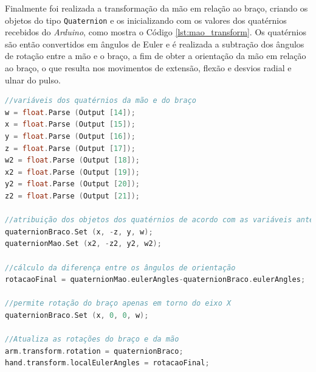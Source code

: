 Finalmente foi realizada a transformação da mão em relação ao braço, criando os objetos do tipo \lstinline!Quaternion! e os inicializando com os valores dos quatérnios recebidos do \textit{Arduino}, como mostra o Código \ref{lst:mao_transform}. Os quatérnios são então convertidos em ângulos de Euler e é realizada a subtração dos ângulos de rotação entre a mão e o braço, a fim de obter a orientação da mão em relação ao braço, o que resulta nos movimentos de extensão, flexão e desvios radial e ulnar do pulso.

\begin{lstlisting}[language=C++,label=lst:mao_transform,caption={Transformações da mão},morekeywords={SerialPort,IsOpen,Close,Open,Quaternion,GameObject,Vector3,Split,transform,localEulerAngles,Parse,Set,eulerAngles}]
//variáveis dos quatérnios da mão e do braço
w = float.Parse (Output [14]);
x = float.Parse (Output [15]);
y = float.Parse (Output [16]);
z = float.Parse (Output [17]);
w2 = float.Parse (Output [18]);
x2 = float.Parse (Output [19]);
y2 = float.Parse (Output [20]);
z2 = float.Parse (Output [21]);

//atribuição dos objetos dos quatérnios de acordo com as variáveis anteriores
quaternionBraco.Set (x, -z, y, w);
quaternionMao.Set (x2, -z2, y2, w2);

//cálculo da diferença entre os ângulos de orientação
rotacaoFinal = quaternionMao.eulerAngles-quaternionBraco.eulerAngles;

//permite rotação do braço apenas em torno do eixo X
quaternionBraco.Set (x, 0, 0, w);

//Atualiza as rotações do braço e da mão
arm.transform.rotation = quaternionBraco;
hand.transform.localEulerAngles = rotacaoFinal;
\end{lstlisting}

